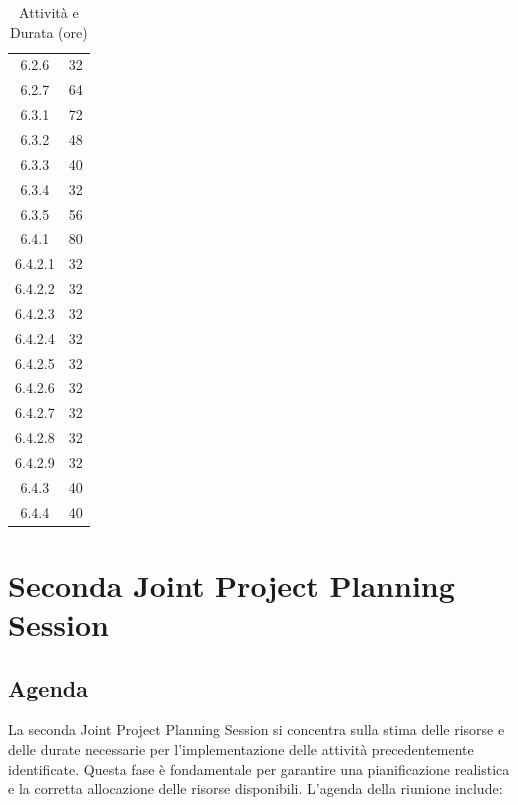 \begin{table}[H]
\begin{tabular}{|c|c|}
        6.2.6             & 32                    \\
        6.2.7             & 64                    \\
        6.3.1             & 72                    \\
        6.3.2             & 48                    \\
        6.3.3             & 40                    \\
        6.3.4             & 32                    \\
        6.3.5             & 56                    \\
        6.4.1             & 80                    \\
        6.4.2.1           & 32                    \\
        6.4.2.2           & 32                    \\
        6.4.2.3           & 32                    \\
        6.4.2.4           & 32                    \\
        6.4.2.5           & 32                    \\
        6.4.2.6           & 32                    \\
        6.4.2.7           & 32                    \\
        6.4.2.8           & 32                    \\
        6.4.2.9           & 32                    \\
        6.4.3             & 40                    \\
        6.4.4             & 40                    \\
        \hline
    \end{tabular}
    \caption{Attività e Durata (ore)}
    \label{tab:attivita-durata}
\end{table}

\section{Seconda Joint Project Planning Session}

\subsection{Agenda}

La seconda Joint Project Planning Session si concentra sulla stima delle risorse e delle durate necessarie per l'implementazione delle attività precedentemente identificate. Questa fase è fondamentale per garantire una pianificazione realistica e la corretta allocazione delle risorse disponibili. L'agenda della riunione include:

